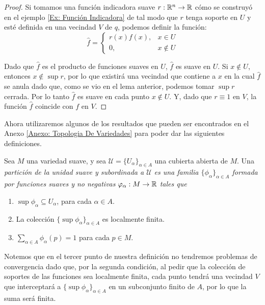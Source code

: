 \begin{proof}
	Si tomamos una función indicadora suave $r: \mathbb{R}^n \to \mathbb{R}$ cómo se construyó en el ejemplo \ref{Ex: Función Indicadora} de tal modo que $r$ tenga soporte en $U$ y esté definida en una vecindad $V$ de $q$, podemos definir la función:
	\[
		\hat{f} = \begin{cases}
			r(x)f(x), & x \in U    \\
			0,        & x \notin U
		\end{cases}
	\]

	Dado que $\hat{f}$ es el producto de funciones suaves en $U$, $\hat{f}$ es suave en $U$. Si $x \notin U$, entonces $x \notin \sup r$, por lo que existirá una vecindad que contiene a $x$ en la cual $\hat{f}$ se anula dado que, como se vio en el lema anterior, podemos tomar $\sup r$ cerrada. Por lo tanto $\hat{f}$ es suave en cada punto $x \notin U$. Y, dado que $r \equiv 1$ en $V$, la función $\hat{f}$ coincide con $f$ en $V$.
\end{proof}

Ahora utilizaremos algunos de los resultados que pueden ser encontrados en el Anexo \ref{Anexo: Topologia De Variedades} para poder dar las siguientes definiciones.

\begin{definition}\label{Definición: Partición de la Unidad Subordnada}
	Sea $M$ una variedad suave, y sea $\mathcal{U} = \{ U_\alpha \}_{\alpha \in A}$ una cubierta abierta de $M$. Una \it{partición de la unidad suave y subordinada a} $\mathcal{U}$ es una familia $\{ \phi_{\alpha} \}_{\alpha \in A}$ formada por funciones suaves y no negativas $\varphi_{\alpha} : M \to \mathbb{R}$ tales que
	\begin{enumerate}
		\item $\sup \phi_\alpha \subseteq U_\alpha$, para cada $\alpha \in A$.
		\item La colección $\{\sup \phi_\alpha \}_{\alpha \in A}$ es localmente finita.
		\item $\sum_{\alpha \in A} \phi_\alpha (p) = 1$ para cada $p \in M$.
	\end{enumerate}
\end{definition}

Notemos que en el tercer punto de nuestra definición no tendremos problemas de convergencia dado que, por la segunda condición, al pedir que la colección de soportes de las funciones sea localmente finita, cada punto tendrá una vecindad $V$ que interceptará a $\{\sup \phi_{\alpha}\}_{\alpha \in A}$ en un subconjunto finito de $A$, por lo que la suma será finita.

